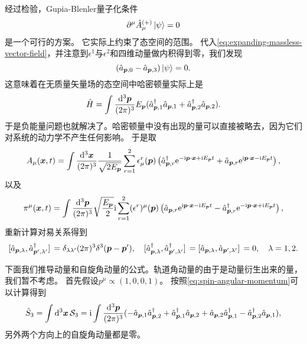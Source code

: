 \documentclass[hyperref, UTF8, a4paper]{ctexart}
\newcommand*{\ii}{\mathrm{i}}
\newcommand*{\ee}{\mathrm{e}}
\begin{document}
经过检验，Gupia-Blenler量子化条件
\begin{equation}
    \partial^\mu \hat{A}_\mu^{(+)} \ket{\psi} = 0
\end{equation}
是一个可行的方案。%
它实际上约束了态空间的范围。
代入\eqref{eq:expanding-massless-vector-field}，并注意到$\epsilon^1$与$\epsilon^2$和四维动量做内积得到零，我们发现
\begin{equation}
    (\hat{a}_{\vb*{p}, 0} - \hat{a}_{\vb*{p}, 3}) \ket{\psi} = 0.
\end{equation}
这意味着在无质量矢量场的态空间中哈密顿量实际上是
\begin{equation}
    \hat{H} = \int \frac{\dd[3]{\vb*{p}}}{(2\pi)^3} E_{\vb*{p}} (\hat{a}_{\vb*{p},1}^\dagger \hat{a}_{\vb*{p}, 1} + \hat{a}_{\vb*{p},2}^\dagger \hat{a}_{\vb*{p}, 2}).
\end{equation}
于是负能量问题也就解决了。哈密顿量中没有出现的量可以直接被略去，因为它们对系统的动力学不产生任何影响。
于是取
\begin{equation}
    A_\mu (\vb*{x}, t) = \int \frac{\dd[3]{\vb*{x}}}{(2\pi)^3} \frac{1}{\sqrt{2 E_{\vb*{p}}}} \sum_{r=1}^2 \epsilon_\mu^r(\vb*{p}) \left(\hat{a}_{\vb*{p}, r}^\dagger \ee^{ - \ii \vb*{p} \cdot \vb*{x} + \ii E_{\vb*{p}} t} + \hat{a}_{\vb*{p}, r} \ee^{ \ii \vb*{p} \cdot \vb*{x} - \ii E_{\vb*{p}} t} \right),
\end{equation}
以及
\begin{equation}
    \pi^\mu (\vb*{x}, t) = \int \frac{\dd[3]{\vb*{p}}}{(2\pi)^3} \sqrt{\frac{E_{\vb*{p}}}{2}} \ii \sum_{r=1}^2 (\epsilon^r)^\mu (\vb*{p}) \left( \hat{a}_{\vb*{p}, r} \ee^{\ii \vb*{p} \cdot \vb*{x} - \ii E_{\vb*{p}} t} - \hat{a}_{\vb*{p}, r}^\dagger \ee^{ - \ii \vb*{p} \cdot \vb*{x} + \ii E_{\vb*{p}} t} \right),
\end{equation}
重新计算对易关系得到
\begin{equation}
    \comm*{\hat{a}_{\vb*{p}, \lambda}}{\hat{a}^\dagger_{\vb*{p}', \lambda'}} = \delta_{\lambda \lambda'} (2\pi)^3 \delta^3(\vb*{p} - \vb*{p}'), \quad \comm*{\hat{a}^\dagger_{\vb*{p}, \lambda}}{\hat{a}^\dagger_{\vb*{p}', \lambda'}} = \comm*{\hat{a}_{\vb*{p}, \lambda}}{\hat{a}_{\vb*{p}', \lambda'}} = 0, \quad \lambda = 1, 2.
\end{equation}

下面我们推导动量和自旋角动量的公式。轨道角动量的由于是动量衍生出来的量，我们暂不考虑。
首先假设$p^\mu \propto (1, 0, 0, 1)$。
按照\eqref{eq:spin-angular-momentum}可以计算得到
\[
    \hat{S}_3 = \int \dd[3]{\vb*{x}} \mathcal{S}_3 = \ii \int \frac{\dd[3]{\vb*{p}}}{(2\pi)^3} (- \hat{a}_{\vb*{p},1} \hat{a}^\dagger_{\vb*{p}, 2} + \hat{a}^\dagger_{\vb*{p}, 1} \hat{a}_{\vb*{p}, 2} + \hat{a}_{\vb*{p}, 2} \hat{a}_{\vb*{p}, 1}^\dagger - \hat{a}_{\vb*{p}, 2}^\dagger \hat{a}_{\vb*{p}, 1} ) ,
\]
另外两个方向上的自旋角动量都是零。
\end{document}
